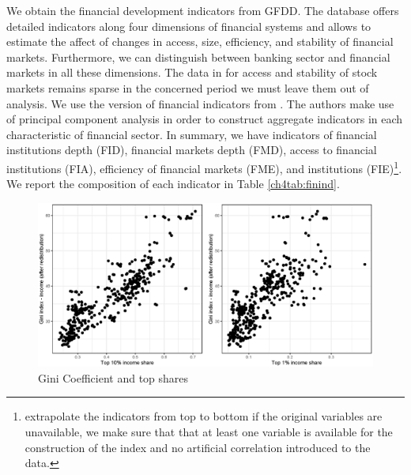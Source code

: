 \begin{refsection}
We obtain the financial development indicators from \ac{GFDD}. The database offers detailed indicators along four dimensions of financial systems and allows to estimate the affect of changes in access, size, efficiency, and stability of financial markets. Furthermore, we can distinguish between banking sector and financial markets in all these dimensions. The data in for access and stability of stock markets remains sparse in the concerned period we must leave them out of analysis. We use the version of financial indicators from \cite{svirydzenka2016introducing}. The authors make use of principal component analysis in order to construct aggregate indicators in each characteristic of financial sector. In summary, we have indicators of financial institutions depth (FID), financial markets depth (FMD), access to financial institutions (FIA), efficiency of financial markets (FME), and institutions (FIE)\footnote{\textcite{svirydzenka2016introducing} extrapolate the indicators from top to bottom if the original variables are unavailable, we make sure that that at least one variable is available for the construction of the index and no artificial correlation introduced to the data.}. We report the composition of each indicator in Table \ref{ch4tab:finind}. 

\begin{figure}
  \caption{Gini Coefficient and top shares}
  \label{ch4fig:gini_topshares}
  \includegraphics[width=\textwidth, keepaspectratio]{figures/ch4/plots_ineq}
\end{figure}



\end{refsection}
